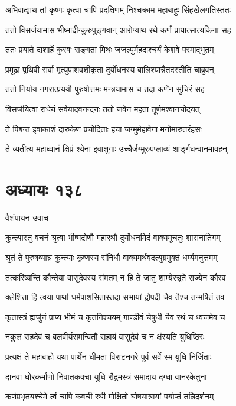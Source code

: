 \twolineshloka
{अभिवाद्याथ तां कृष्णः कृत्वा चापि प्रदक्षिणम्}
{निश्चक्राम महाबाहुः सिंहखेलगतिस्ततः}


\twolineshloka
{ततो विसर्जयामास भीष्मादीन्कुरुपुङ्गवान्}
{आरोप्याथ रथे कर्णं प्रायात्सात्यकिना सह}


\twolineshloka
{ततः प्रयाते दाशार्हे कुरवः सङ्गता मिथः}
{जजल्पुर्महदाश्चर्यं केशवे परमाद्भुतम्}


\twolineshloka
{प्रमूढा पृथिवी सर्वा मृत्युपाशवशीकृता}
{दुर्योधनस्य बालिश्यान्नैतदस्तीति चाब्रुवन्}


\twolineshloka
{ततो निर्याय नगरात्प्रययौ पुरुषोत्तमः}
{मन्त्रयामास च तदा कर्णेन सुचिरं सह}


\twolineshloka
{विसर्जयित्वा राधेयं सर्वयादवनन्दनः}
{ततो जवेन महता तूर्णमश्वानचोदयत्}


\twolineshloka
{ते पिबन्त इवाकाशं दारुकेण प्रचोदिताः}
{हया जग्मुर्महावेगा मनोमारुतरंहसः}


\twolineshloka
{ते व्यतीत्य महाध्वानं क्षिप्रं श्येना इवाशुगाः}
{उच्चैर्जग्मुरुपप्लाव्यं शार्ङ्गधन्वानमावहन्}


\chapter{अध्यायः १३८}
\twolineshloka
{वैशंपायन उवाच}
{}


\twolineshloka
{कुन्त्यास्तु वचनं श्रुत्वा भीष्मद्रोणौ महारथौ}
{दुर्योधनमिदं वाक्यमूचतुः शासनातिगम्}


\twolineshloka
{श्रुतं ते पुरुषव्याघ्र कुन्त्याः कृष्णस्य संनिधौ}
{वाक्यमर्थवदत्युग्रमुक्तं धर्म्यमनुत्तमम्}


\twolineshloka
{तत्करिष्यन्ति कौन्तेया वासुदेवस्य संमतम्}
{न हि ते जातु शाम्येरन्नृते राज्येन कौरव}


\twolineshloka
{क्लेशिता हि त्वया पार्था धर्मपाशसितास्तदा}
{सभायां द्रौपदी चैव तैश्च तन्मर्षितं तव}


\twolineshloka
{कृतास्त्रं ह्यर्जुनं प्राप्य भीमं च कृतनिश्चयम्}
{गाण्डीवं चेषुधी चैव रथं च ध्वजमेव च}


\twolineshloka
{नकुलं सहदेवं च बलवीर्यसमन्वितौ}
{सहायं वासुदेवं च न क्षंस्यति युधिष्ठिरः}


\twolineshloka
{प्रत्यक्षं ते महाबाहो यथा पार्थेन धीमता}
{विराटनगरे पूर्वं सर्वे स्म युधि निर्जिताः}


\twolineshloka
{दानवा घोरकर्माणो निवातकवचा युधि}
{रौद्रमस्त्रं समादाय दग्धा वानरकेतुना}


\twolineshloka
{कर्णप्रभृतयश्चेमे त्वं चापि कवची रथी}
{मोक्षितो घोषयात्रायां पर्याप्तं तन्निदर्शनम्}


